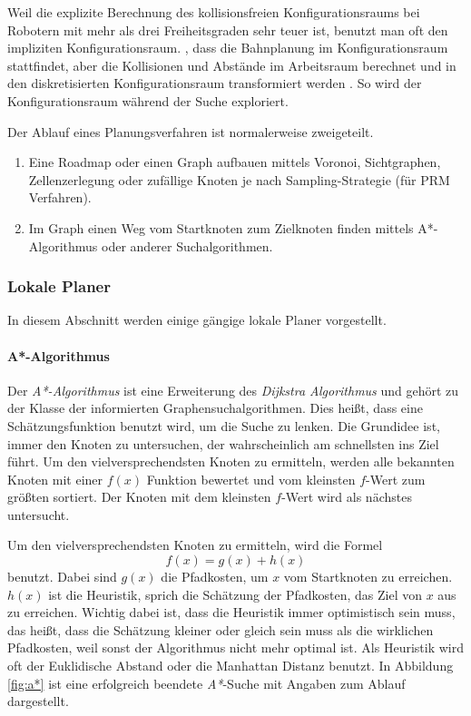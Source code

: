 Weil die explizite Berechnung des kollisionsfreien Konfigurationsraums bei Robotern mit mehr als drei Freiheitsgraden sehr teuer ist, benutzt man oft den impliziten Konfigurationsraum.
\Dh, dass die Bahnplanung im Konfigurationsraum stattfindet, aber die Kollisionen und Abstände im Arbeitsraum berechnet und in den diskretisierten Konfigurationsraum transformiert werden \citep{innoKonz}.
So wird der Konfigurationsraum während der Suche exploriert.

Der Ablauf eines Planungsverfahren ist normalerweise zweigeteilt\cite{Russell2003}.
\begin{enumerate}
\item Eine Roadmap oder einen Graph aufbauen mittels \gls{Voronoi}, \gls{Sichtgraphen}, \gls{Zellenzerlegung} oder zufällige Knoten je nach Sampling-Strategie (\zB für \gls{PRM} Verfahren\cite{Thrun2005}).
\item Im Graph einen Weg vom Startknoten zum Zielknoten finden mittels A*-Algorithmus oder anderer Suchalgorithmen.
\end{enumerate}

\subsubsection{Lokale Planer}
\label{bahnplanung_lokale_planer_sec}

In diesem Abschnitt werden einige gängige lokale Planer vorgestellt.

\paragraph{A*-Algorithmus} 

Der \textit{A*-Algorithmus}\citep{Russell2003} ist eine Erweiterung des \textit{Dijkstra Algorithmus} und gehört zu der Klasse der informierten Graphensuchalgorithmen.
Dies heißt, dass eine Schätzungsfunktion benutzt wird, um die Suche zu lenken.
Die Grundidee ist, immer den Knoten zu untersuchen, der wahrscheinlich am schnellsten ins Ziel führt.
Um den vielversprechendsten Knoten zu ermitteln, werden alle bekannten Knoten mit einer $f(x)$ Funktion bewertet und vom kleinsten $f$-Wert zum größten sortiert.
Der Knoten mit dem kleinsten $f$-Wert wird als nächstes untersucht. 

Um den vielversprechendsten Knoten zu ermitteln, wird die Formel
\begin{equation}
 f(x) = g(x) + h(x)
\end{equation}
benutzt.
Dabei sind $g(x)$ die Pfadkosten, um $x$ vom Startknoten zu erreichen.
$h(x)$ ist die Heuristik, sprich die Schätzung der Pfadkosten, das Ziel von $x$ aus zu erreichen.
Wichtig dabei ist, dass die Heuristik immer optimistisch sein muss, das heißt, dass die Schätzung kleiner oder gleich sein muss als die wirklichen Pfadkosten, weil sonst der Algorithmus nicht mehr optimal ist.
Als Heuristik wird oft der Euklidische Abstand oder die Manhattan Distanz benutzt.
In Abbildung \ref{fig:a*} ist eine erfolgreich beendete \textit{A*}-Suche mit Angaben zum Ablauf dargestellt.

